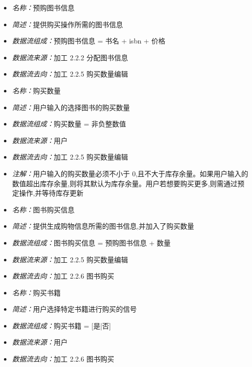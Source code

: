 \documentclass{article}
\begin{document}
\begin{CJK*}{UTF8}{gbsn}
\vspace{-1mm}

\begin{itemize}
\item \textit{名称：}预购图书信息
\item \textit{简述：}提供购买操作所需的图书信息
\item \textit{数据流组成：}预购图书信息  = 书名 + isbn + 价格
\item \textit{数据流来源：}加工 2.2.2 分配图书信息
\item \textit{数据流去向：}加工 2.2.5 购买数量编辑
\end{itemize}

\vspace{-1mm}

\begin{itemize}
	\item \textit{名称：}购买数量
	\item \textit{简述：}用户输入的选择图书的购买数量
	\item \textit{数据流组成：}购买数量 = 非负整数值
	\item \textit{数据流来源：}用户
	\item \textit{数据流去向：}加工 2.2.5 购买数量编辑
	\item \textit{注解：}用户输入的购买数量必须不小于 0,且不大于库存余量。如果用户输入的数值超出库存余量,则将其默认为库存余量。用户若想要购买更多,则需通过预定操作,并等待库存更新
\end{itemize}

\vspace{-1mm}

\begin{itemize}
	\item \textit{名称：}图书购买信息
	\item \textit{简述：}提供生成购物信息所需的图书信息,并加入了购买数量
	\item \textit{数据流组成：}图书购买信息  = 预购图书信息 + 数量
	\item \textit{数据流来源：}加工 2.2.5 购买数量编辑
	\item \textit{数据流去向：}加工 2.2.6 图书购买
\end{itemize}

\vspace{-1mm}

\begin{itemize}
	\item \textit{名称：}购买书籍
	\item \textit{简述：}用户选择特定书籍进行购买的信号
	\item \textit{数据流组成：}购买书籍 = [是|否]
	\item \textit{数据流来源：}用户
	\item \textit{数据流去向：}加工 2.2.6 图书购买
\end{itemize}


\end{CJK*}
\end{document}

